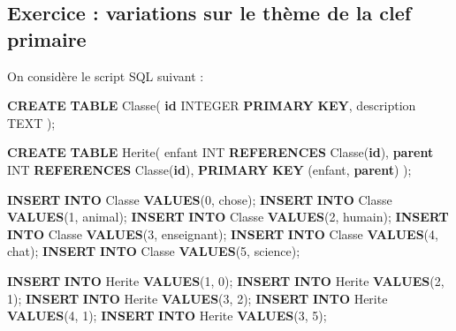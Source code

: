 \documentclass[11pt]{article}
\newenvironment{Shaded}{}{}
\newcommand{\KeywordTok}[1]{\textcolor[rgb]{0.00,0.44,0.13}{\textbf{{#1}}}}
\newcommand{\DataTypeTok}[1]{\textcolor[rgb]{0.56,0.13,0.00}{{#1}}}
\newcommand{\DecValTok}[1]{\textcolor[rgb]{0.25,0.63,0.44}{{#1}}}
\newcommand{\StringTok}[1]{\textcolor[rgb]{0.25,0.44,0.63}{{#1}}}
\newcommand{\NormalTok}[1]{{#1}}
\begin{document}
    \hypertarget{exercice-variations-sur-le-thuxe8me-de-la-clef-primaire}{%
\subsection{Exercice : variations sur le thème de la clef
primaire}\label{exercice-variations-sur-le-thuxe8me-de-la-clef-primaire}}

On considère le script SQL suivant :

\begin{Shaded}
\begin{Highlighting}[]
\KeywordTok{CREATE} \KeywordTok{TABLE}\NormalTok{ Classe(}
  \KeywordTok{id} \DataTypeTok{INTEGER} \KeywordTok{PRIMARY} \KeywordTok{KEY}\NormalTok{,}
\NormalTok{  description TEXT}
\NormalTok{);}

\KeywordTok{CREATE} \KeywordTok{TABLE}\NormalTok{ Herite(}
\NormalTok{  enfant }\DataTypeTok{INT} \KeywordTok{REFERENCES}\NormalTok{ Classe(}\KeywordTok{id}\NormalTok{),}
  \KeywordTok{parent} \DataTypeTok{INT} \KeywordTok{REFERENCES}\NormalTok{ Classe(}\KeywordTok{id}\NormalTok{),}
  \KeywordTok{PRIMARY} \KeywordTok{KEY}\NormalTok{ (enfant, }\KeywordTok{parent}\NormalTok{)}
\NormalTok{);}

\KeywordTok{INSERT} \KeywordTok{INTO}\NormalTok{ Classe }\KeywordTok{VALUES}\NormalTok{(}\DecValTok{0}\NormalTok{, }\StringTok{\textquotesingle{}chose\textquotesingle{}}\NormalTok{);}
\KeywordTok{INSERT} \KeywordTok{INTO}\NormalTok{ Classe }\KeywordTok{VALUES}\NormalTok{(}\DecValTok{1}\NormalTok{, }\StringTok{\textquotesingle{}animal\textquotesingle{}}\NormalTok{);}
\KeywordTok{INSERT} \KeywordTok{INTO}\NormalTok{ Classe }\KeywordTok{VALUES}\NormalTok{(}\DecValTok{2}\NormalTok{, }\StringTok{\textquotesingle{}humain\textquotesingle{}}\NormalTok{);}
\KeywordTok{INSERT} \KeywordTok{INTO}\NormalTok{ Classe }\KeywordTok{VALUES}\NormalTok{(}\DecValTok{3}\NormalTok{, }\StringTok{\textquotesingle{}enseignant\textquotesingle{}}\NormalTok{);}
\KeywordTok{INSERT} \KeywordTok{INTO}\NormalTok{ Classe }\KeywordTok{VALUES}\NormalTok{(}\DecValTok{4}\NormalTok{, }\StringTok{\textquotesingle{}chat\textquotesingle{}}\NormalTok{);}
\KeywordTok{INSERT} \KeywordTok{INTO}\NormalTok{ Classe }\KeywordTok{VALUES}\NormalTok{(}\DecValTok{5}\NormalTok{, }\StringTok{\textquotesingle{}science\textquotesingle{}}\NormalTok{);}

\KeywordTok{INSERT} \KeywordTok{INTO}\NormalTok{ Herite }\KeywordTok{VALUES}\NormalTok{(}\DecValTok{1}\NormalTok{, }\DecValTok{0}\NormalTok{);}
\KeywordTok{INSERT} \KeywordTok{INTO}\NormalTok{ Herite }\KeywordTok{VALUES}\NormalTok{(}\DecValTok{2}\NormalTok{, }\DecValTok{1}\NormalTok{);}
\KeywordTok{INSERT} \KeywordTok{INTO}\NormalTok{ Herite }\KeywordTok{VALUES}\NormalTok{(}\DecValTok{3}\NormalTok{, }\DecValTok{2}\NormalTok{);}
\KeywordTok{INSERT} \KeywordTok{INTO}\NormalTok{ Herite }\KeywordTok{VALUES}\NormalTok{(}\DecValTok{4}\NormalTok{, }\DecValTok{1}\NormalTok{);}
\KeywordTok{INSERT} \KeywordTok{INTO}\NormalTok{ Herite }\KeywordTok{VALUES}\NormalTok{(}\DecValTok{3}\NormalTok{, }\DecValTok{5}\NormalTok{);}
\end{Highlighting}
\end{Shaded}
\end{document}
